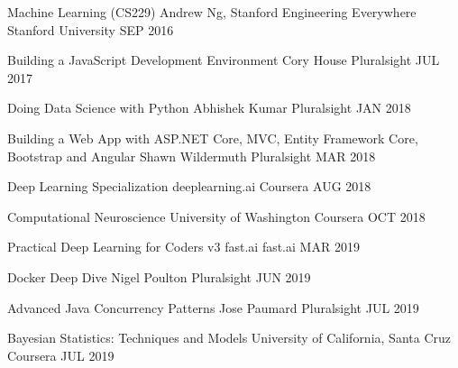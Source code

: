

\begin{cvhonors}

  \cvhonor
    {Machine Learning (CS229)} %
    {Andrew Ng, Stanford Engineering Everywhere} %
    {Stanford University} %
    {SEP 2016} %

  \cvhonor
    {Building a JavaScript Development Environment} %
    {Cory House} %
    {Pluralsight} %
    {JUL 2017} %

  \cvhonor
    {Doing Data Science with Python} %
    {Abhishek Kumar} %
    {Pluralsight} %
    {JAN 2018} %

  \cvhonor
    {Building a Web App with ASP.NET Core, MVC, Entity Framework Core, Bootstrap and Angular} %
    {Shawn Wildermuth} %
    {Pluralsight} %
    {MAR 2018} %

  \cvhonor
    {Deep Learning Specialization} %
    {deeplearning.ai} %
    {Coursera} %
    {AUG 2018} %

  \cvhonor
    {Computational Neuroscience} %
    {University of Washington} %
    {Coursera} %
    {OCT 2018} %

  \cvhonor
    {Practical Deep Learning for Coders v3} %
    {fast.ai} %
    {fast.ai} %
    {MAR 2019} %

  \cvhonor
    {Docker Deep Dive} %
    {Nigel Poulton} %
    {Pluralsight} %
    {JUN 2019} %

  \cvhonor
    {Advanced Java Concurrency Patterns} %
    {Jose Paumard} %
    {Pluralsight} %
    {JUL 2019} %

  \cvhonor
    {Bayesian Statistics: Techniques and Models} %
    {University of California, Santa Cruz} %
    {Coursera} %
    {JUL 2019} %

\end{cvhonors}
